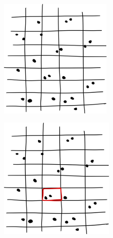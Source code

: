\begin{figure}
\begin{minipage}[b]{0.2\linewidth}
		\includegraphics[width=\linewidth]{./pic/outflow_ex2.png}
		\subcaption{}
		\label{}
	\end{minipage} 
	\begin{minipage}[b]{0.2\linewidth}
		\centering
		\includegraphics[width=\linewidth]{./pic/outflow_ex3.png}

\end{minipage}
\end{figure}
